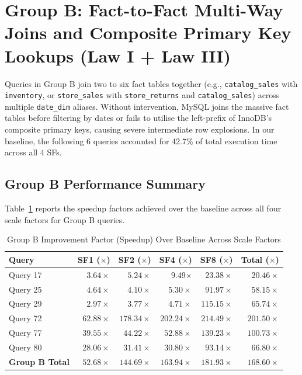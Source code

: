 \documentclass{ULBreport}
\begin{document}
\section{Group B: Fact-to-Fact Multi-Way Joins and Composite Primary Key Lookups (Law I + Law III)}

Queries in Group B join two to six fact tables together (e.g., \texttt{catalog\_sales} with \texttt{inventory}, or \texttt{store\_sales} with \texttt{store\_returns} and \texttt{catalog\_sales}) across multiple \texttt{date\_dim} aliases. Without intervention, MySQL joins the massive fact tables before filtering by dates or fails to utilise the left-prefix of InnoDB's composite primary keys, causing severe intermediate row explosions. In our baseline, the following 6 queries accounted for 42.7\% of total execution time across all 4 SFs.

\subsection{Group B Performance Summary}
Table~\ref{tab:group_b_results} reports the speedup factors achieved over the baseline across all four scale factors for Group B queries.

\begin{table}[htbp]
\centering
\caption{Group B Improvement Factor (Speedup) Over Baseline Across Scale Factors}
\label{tab:group_b_results}
\begin{tabular}{@{}lrrrrr@{}}
\toprule
\textbf{Query} & \textbf{SF1 ($\times$)} & \textbf{SF2 ($\times$)} & \textbf{SF4 ($\times$)} & \textbf{SF8 ($\times$)} & \textbf{Total ($\times$)} \\ \midrule
Query 17 & $3.64\times$& $5.24\times$& 9.49$\times$& $23.38\times$& $20.46\times$\\
Query 25 & $4.64\times$& $4.10\times$& $5.30\times$& $91.97\times$& $58.15\times$\\
Query 29 & $2.97\times$& $3.77\times$& $4.71\times$& $115.15\times$& $65.74\times$\\
Query 72 & $62.88\times$& $178.34\times$& $202.24\times$& $214.49\times$& $201.50\times$\\
Query 77 & $39.55\times$& $44.22\times$& $52.88\times$& $139.23\times$& $100.73\times$\\
Query 80 & $28.06\times$& $31.41\times$& $30.80\times$& $93.14\times$& $66.80\times$\\ \midrule
\textbf{Group B Total }& $52.68\times$& $144.69\times$& $163.94\times$& $181.93\times$& $168.60\times$\\ \bottomrule
\end{tabular}
\end{table}
\end{document}
